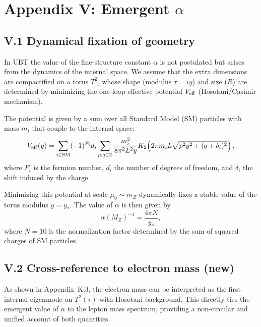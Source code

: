 
\appendix
\section*{Appendix V: Emergent $\alpha$}

\subsection*{V.1 Dynamical fixation of geometry}
In UBT the value of the fine-structure constant $\alpha$ is not postulated 
but arises from the dynamics of the internal space. We assume that the 
extra dimensions are compactified on a torus $T^2$, whose shape (modulus 
$\tau=i y$) and size ($R$) are determined by minimizing the one-loop 
effective potential $V_{\rm eff}$ (Hosotani/Casimir mechanism).

The potential is given by a sum over all Standard Model (SM) particles 
with mass $m_i$ that couple to the internal space:
\begin{equation}
V_{\rm eff}(y) = \sum_{i \in \text{SM}} (-1)^{F_i} d_i 
  \sum_{p,q \in \mathbb{Z}} \frac{m_i^2}{8\pi^2 L^2 y} 
  K_2\!\left(2\pi m_i L \sqrt{p^2 y^2 + (q+\delta_i)^2}\right),
\end{equation}
where $F_i$ is the fermion number, $d_i$ the number of degrees of freedom, 
and $\delta_i$ the shift induced by the charge.

Minimizing this potential at scale $\mu_0\sim m_Z$ dynamically fixes 
a stable value of the torus modulus $y=y_\ast$. The value of $\alpha$ 
is then given by
\begin{equation}
\alpha(M_Z)^{-1} = \frac{4\pi N}{y_\ast},
\end{equation}
where $N=10$ is the normalization factor determined by the sum of squared 
charges of SM particles.

\subsection*{V.2 Cross-reference to electron mass (new)}
As shown in Appendix~K.3, the electron mass can be interpreted as the first 
internal eigenmode on $T^2(\tau)$ with Hosotani background. This directly ties 
the emergent value of $\alpha$ to the lepton mass spectrum, providing a 
non-circular and unified account of both quantities.


